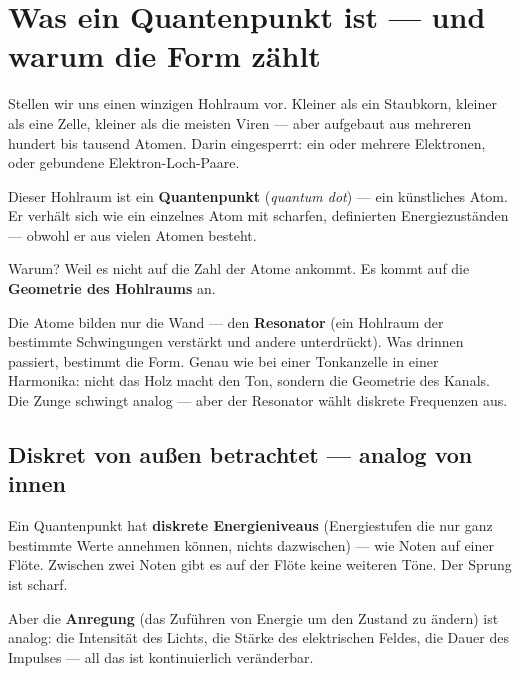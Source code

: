 
\section{Was ein Quantenpunkt ist --- und warum die Form zählt}

Stellen wir uns einen winzigen Hohlraum vor. Kleiner als ein Staubkorn,
kleiner als eine Zelle, kleiner als die meisten Viren --- aber aufgebaut
aus mehreren hundert bis tausend Atomen. Darin eingesperrt:
ein oder mehrere Elektronen, oder gebundene Elektron-Loch-Paare.

Dieser Hohlraum ist ein \textbf{Quantenpunkt} (\textit{quantum dot}) ---
ein künstliches Atom. Er verhält sich wie ein einzelnes Atom mit
scharfen, definierten Energiezuständen --- obwohl er aus vielen
Atomen besteht.

Warum? Weil es nicht auf die Zahl der Atome ankommt.
Es kommt auf die \textbf{Geometrie des Hohlraums} an.

Die Atome bilden nur die Wand --- den \textbf{Resonator}
(ein Hohlraum der bestimmte Schwingungen verstärkt und andere unterdrückt).
Was drinnen passiert, bestimmt die Form. Genau wie bei einer
Tonkanzelle in einer Harmonika: nicht das Holz macht den Ton,
sondern die Geometrie des Kanals. Die Zunge schwingt analog ---
aber der Resonator wählt diskrete Frequenzen aus.

\subsection{Diskret von außen betrachtet --- analog von innen}

Ein Quantenpunkt hat \textbf{diskrete Energieniveaus}
(Energiestufen die nur ganz bestimmte Werte annehmen können,
nichts dazwischen) --- wie Noten auf einer Flöte.
Zwischen zwei Noten gibt es auf der Flöte keine weiteren Töne.
Der Sprung ist scharf.

Aber die \textbf{Anregung} (das Zuführen von Energie um den Zustand
zu ändern) ist analog: die Intensität des Lichts, die Stärke des
elektrischen Feldes, die Dauer des Impulses --- all das ist
kontinuierlich veränderbar.

